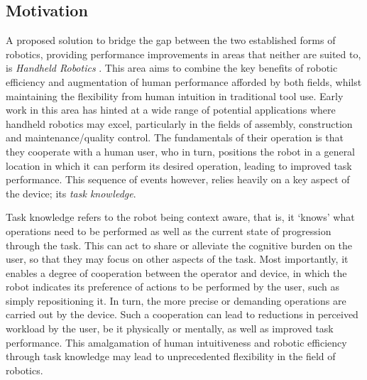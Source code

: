 \documentclass[11pt]{article}
\begin{document}
\subsection{Motivation}
A proposed solution to bridge the gap between the two established forms of robotics, providing performance improvements in areas that neither are suited to, is \textit{Handheld Robotics} \cite{GreggSmithDesign}. This area aims to combine the key benefits of robotic efficiency and augmentation of human performance afforded by both fields, whilst maintaining the flexibility from human intuition in traditional tool use. Early work in this area has hinted at a wide range of potential applications where handheld robotics may excel, particularly in the fields of assembly, construction and maintenance/quality control. The fundamentals of their operation is that they cooperate with a human user, who in turn, positions the robot in a general location in which it can perform its desired operation, leading to improved task performance. This sequence of events however, relies heavily on a key aspect of the device; its \textit{task knowledge}. 

Task knowledge refers to the robot being context aware, that is, it `knows' what operations need to be performed as well as the current state of progression through the task. This can act to share or alleviate the cognitive burden on the user, so that they may focus on other aspects of the task. Most importantly, it enables a degree of cooperation between the operator and device, in which the robot indicates its preference of actions to be performed by the user, such as simply repositioning it. In turn, the more precise or demanding operations are carried out by the device. Such a cooperation can lead to reductions in perceived workload by the user, be it physically or mentally, as well as improved task performance. This amalgamation of human intuitiveness and robotic efficiency through task knowledge may lead to unprecedented flexibility in the field of robotics.
\end{document}
